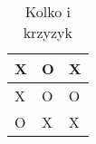 \begin{table}[htbp]
\centering
\begin{tabular}{|l|l|l|}
\hline
X & O & X \\ \hline
X & O & O \\ \hline
O & X & X \\ \hline
\end{tabular}
\label{tab:table_bartek}
\caption{Kolko i krzyzyk}
\end{table}